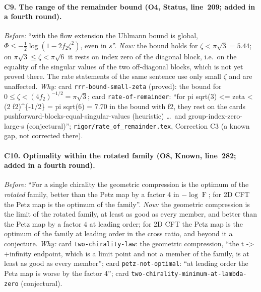 \documentclass[11pt]{article}
\theoremstyle{accent}
\theoremstyle{definition}
\newcommand{\Fid}{\operatorname{F}}
\begin{document}
{\paragraph{C9. The range of the remainder bound (O4, Status, line~209; added in a fourth round).}
\emph{Before:} ``with the flow extension the Uhlmann bound is global, \(\Phi\le-\frac12\log(1-2f_2\zeta^2)\), even in \(s\)''.
\emph{Now:} the bound holds for \(\zeta<\pi\sqrt3=5.44\); on \(\pi\sqrt3\le\zeta<\pi\sqrt6\) it rests on index zero of the
diagonal block, i.e.\ on the equality of the singular values of the two off-diagonal blocks, which is not yet proved
there.  The rate statements of the same sentence use only small \(\zeta\) and are unaffected.
\emph{Why:} card \texttt{rrr-bound-small-zeta} (proved): the bound for \(0\le\zeta<(4f_2)^{-1/2}=\pi\sqrt3\); card
\texttt{rate-of-remainder}: ``for pi sqrt(3) <= zeta < (2 f2)\^{}\{-1/2\} = pi sqrt(6) = 7.70 in the bound with f2, they
rest on the cards pushforward-blocks-equal-singular-values (heuristic) \dots\ and group-index-zero-large-s
(conjectural)''; \texttt{rigor/rate\_of\_remainder.tex}, Correction C3 (a known gap, not corrected there).
\paragraph{C10. Optimality within the rotated family (O8, Known, line~282; added in a fourth round).}
\emph{Before:} ``For a single chirality the geometric compression is the optimum of the \emph{rotated} family, better than
the Petz map by a factor \(4\) in \(-\log\Fid\); for 2D CFT the Petz map is the optimum of the family''.
\emph{Now:} the geometric compression is the limit of the rotated family, at least as good as every member, and better
than the Petz map by a factor \(4\) at leading order; for 2D CFT the Petz map is the optimum of the family at leading
order in the cross ratio, and beyond it a conjecture.
\emph{Why:} card \texttt{two-chirality-law}: the geometric compression, ``the t -> +infinity endpoint, which is a limit
point and not a member of the family, is at least as good as every member''; card \texttt{petz-not-optimal}: ``at leading
order the Petz map is worse by the factor 4''; card \texttt{two-chirality-minimum-at-lambda-zero} (conjectural).
\par}
\end{document}
